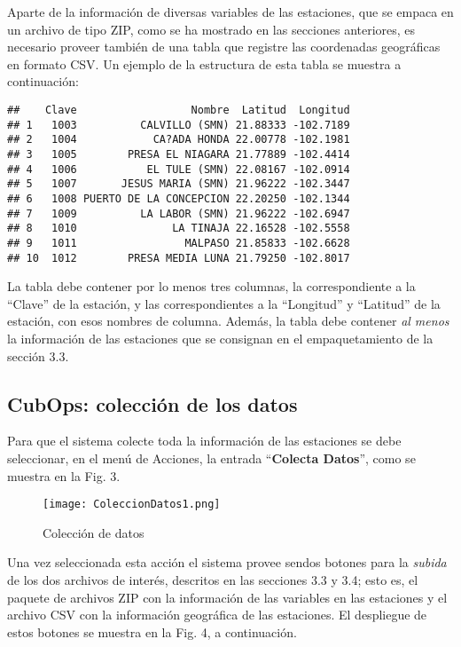 \documentclass[spanish,]{article}
\begin{document}
Aparte de la información de diversas variables de las estaciones, que se
empaca en un archivo de tipo ZIP, como se ha mostrado en las secciones
anteriores, es necesario proveer también de una tabla que registre las
coordenadas geográficas en formato CSV. Un ejemplo de la estructura de
esta tabla se muestra a continuación:

\begin{verbatim}
##    Clave                  Nombre  Latitud  Longitud
## 1   1003          CALVILLO (SMN) 21.88333 -102.7189
## 2   1004            CA?ADA HONDA 22.00778 -102.1981
## 3   1005        PRESA EL NIAGARA 21.77889 -102.4414
## 4   1006           EL TULE (SMN) 22.08167 -102.0914
## 5   1007       JESUS MARIA (SMN) 21.96222 -102.3447
## 6   1008 PUERTO DE LA CONCEPCION 22.20250 -102.1344
## 7   1009          LA LABOR (SMN) 21.96222 -102.6947
## 8   1010               LA TINAJA 22.16528 -102.5558
## 9   1011                 MALPASO 21.85833 -102.6628
## 10  1012        PRESA MEDIA LUNA 21.79250 -102.8017
\end{verbatim}

La tabla debe contener por lo menos tres columnas, la correspondiente a
la ``Clave'' de la estación, y las correspondientes a la ``Longitud'' y
``Latitud'' de la estación, con esos nombres de columna. Además, la
tabla debe contener \emph{al menos} la información de las estaciones que
se consignan en el empaquetamiento de la sección 3.3.

\subsection{CubOps: colección de los
datos}\label{cubops-coleccion-de-los-datos}

Para que el sistema colecte toda la información de las estaciones se
debe seleccionar, en el menú de Acciones, la entrada ``\textbf{Colecta
Datos}'', como se muestra en la Fig. 3.

\begin{figure}
\centering
\texttt{[image: ColeccionDatos1.png]}
\caption{Colección de datos}
\end{figure}

Una vez seleccionada esta acción el sistema provee sendos botones para
la \emph{subida} de los dos archivos de interés, descritos en las
secciones 3.3 y 3.4; esto es, el paquete de archivos ZIP con la
información de las variables en las estaciones y el archivo CSV con la
información geográfica de las estaciones. El despliegue de estos botones
se muestra en la Fig. 4, a continuación.
\end{document}
